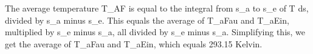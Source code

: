 The average temperature T_AF is equal to the integral from s_a to s_e of T ds, divided by s_a minus s_e. This equals the average of T_aFau and T_aEin, multiplied by s_e minus s_a, all divided by s_e minus s_a. Simplifying this, we get the average of T_aFau and T_aEin, which equals 293.15 Kelvin.